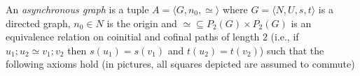 \documentclass[conference]{IEEEtran}
\newcommand{\pgfBox}{
  \begin{pgfonlayer}{background} 
    \fill[blue!2,thick,draw=black!50,rounded corners,inner sep=3mm] ([xshift=-1.5pt]current bounding box.south west) rectangle ([xshift=1.5pt]current bounding box.north east);
  \end{pgfonlayer}
}
\begin{document}
\begin{definition}
  \label{de:async-graph}
  An \emph{asynchronous graph} 
  is a tuple
  $A = \langle G, n_0, \simeq \rangle$ where
  $G = \langle N, U, s, t \rangle$ is a directed graph,
  $n_0 \in N$ is the origin and
  ${\simeq} \subseteq P_2(G) \times P_2(G)$ is an equivalence
  relation
  on coinitial and cofinal paths of length $2$ (i.e., if
  $u_1;u_2 \simeq v_1;v_2$ then $s(u_1)=s(v_1)$ and $t(u_2)=t(v_2)$)
  such that the following axioms hold (in pictures, all squares
  depicted are assumed to commute)
  \begin{enumerate}


\end{enumerate}
\end{definition}
\end{document}
